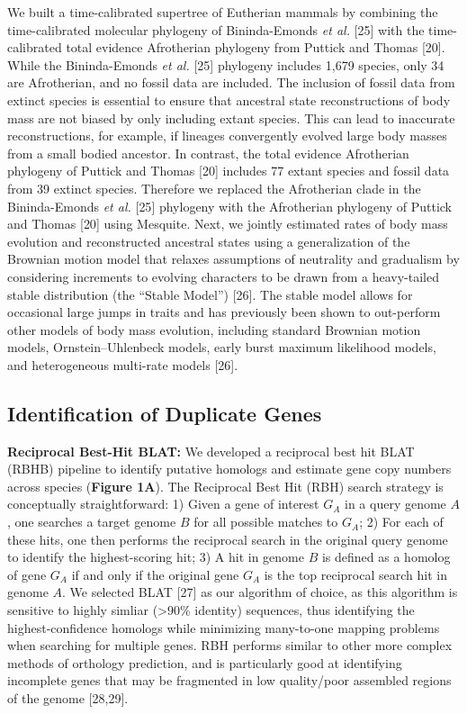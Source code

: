 \documentclass[]{elsarticle} %
\begin{document}
We built a time-calibrated supertree of Eutherian mammals by combining
the time-calibrated molecular phylogeny of Bininda-Emonds \emph{et al.}
{[}25{]} with the time-calibrated total evidence Afrotherian phylogeny
from Puttick and Thomas {[}20{]}. While the Bininda-Emonds \emph{et al.}
{[}25{]} phylogeny includes 1,679 species, only 34 are Afrotherian, and
no fossil data are included. The inclusion of fossil data from extinct
species is essential to ensure that ancestral state reconstructions of
body mass are not biased by only including extant species. This can lead
to inaccurate reconstructions, for example, if lineages convergently
evolved large body masses from a small bodied ancestor. In contrast, the
total evidence Afrotherian phylogeny of Puttick and Thomas {[}20{]}
includes 77 extant species and fossil data from 39 extinct species.
Therefore we replaced the Afrotherian clade in the Bininda-Emonds
\emph{et al.} {[}25{]} phylogeny with the Afrotherian phylogeny of
Puttick and Thomas {[}20{]} using Mesquite. Next, we jointly estimated
rates of body mass evolution and reconstructed ancestral states using a
generalization of the Brownian motion model that relaxes assumptions of
neutrality and gradualism by considering increments to evolving
characters to be drawn from a heavy-tailed stable distribution (the
``Stable Model'') {[}26{]}. The stable model allows for occasional large
jumps in traits and has previously been shown to out-perform other
models of body mass evolution, including standard Brownian motion
models, Ornstein--Uhlenbeck models, early burst maximum likelihood
models, and heterogeneous multi-rate models {[}26{]}.

\hypertarget{identification-of-duplicate-genes}{%
\subsection{Identification of Duplicate
Genes}\label{identification-of-duplicate-genes}}

\textbf{Reciprocal Best-Hit BLAT:} We developed a reciprocal best hit
BLAT (RBHB) pipeline to identify putative homologs and estimate gene
copy numbers across species (\textbf{Figure 1A}). The Reciprocal Best
Hit (RBH) search strategy is conceptually straightforward: 1) Given a
gene of interest \(G_A\) in a query genome \(A\), one searches a target
genome \(B\) for all possible matches to \(G_A\); 2) For each of these
hits, one then performs the reciprocal search in the original query
genome to identify the highest-scoring hit; 3) A hit in genome \(B\) is
defined as a homolog of gene \(G_A\) if and only if the original gene
\(G_A\) is the top reciprocal search hit in genome \(A\). We selected
BLAT {[}27{]} as our algorithm of choice, as this algorithm is sensitive
to highly simliar (\textgreater{}90\% identity) sequences, thus
identifying the highest-confidence homologs while minimizing many-to-one
mapping problems when searching for multiple genes. RBH performs similar
to other more complex methods of orthology prediction, and is
particularly good at identifying incomplete genes that may be fragmented
in low quality/poor assembled regions of the genome {[}28,29{]}.
\end{document}
